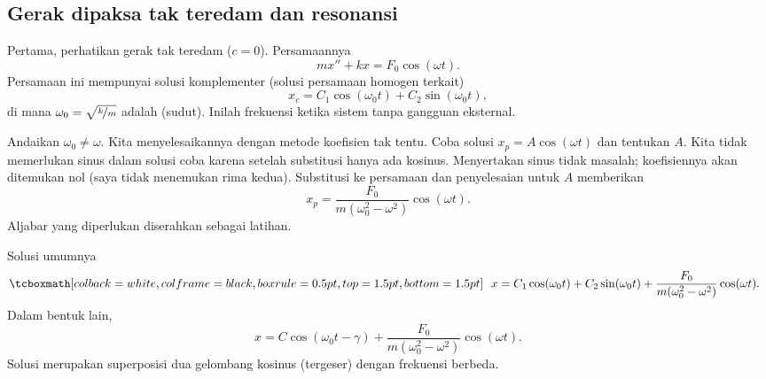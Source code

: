 \subsection{Gerak dipaksa tak teredam dan resonansi}

Pertama, perhatikan gerak tak teredam ($c=0$). Persamaannya
\begin{equation*}
mx'' + kx = F_0 \cos (\omega t) .
\end{equation*}
Persamaan ini mempunyai solusi komplementer (solusi persamaan homogen terkait)
\begin{equation*}
x_c = C_1 \cos (\omega_0 t) + C_2 \sin (\omega_0 t) ,
\end{equation*}
di mana $\omega_0 = \sqrt{\nicefrac{k}{m}}$ adalah \emph{} (sudut). Inilah frekuensi ketika sistem  tanpa gangguan eksternal.

Andaikan $\omega_0 \neq \omega$. Kita menyelesaikannya dengan metode koefisien tak tentu. Coba solusi $x_p = A \cos (\omega t)$ dan tentukan $A$. Kita tidak memerlukan sinus dalam solusi coba karena setelah substitusi hanya ada kosinus. Menyertakan sinus tidak masalah; koefisiennya akan ditemukan nol (saya tidak menemukan rima kedua). Substitusi ke persamaan dan penyelesaian untuk $A$ memberikan
\begin{equation*}
x_p = \frac{F_0}{m(\omega_0^2 - \omega^2)} \cos (\omega t) .
\end{equation*}
Aljabar yang diperlukan diserahkan sebagai latihan.

Solusi umumnya
\begin{equation*}
\mybxbg{
~~
x = C_1 \cos (\omega_0 t) + C_2 \sin (\omega_0 t) +
\frac{F_0}{m(\omega_0^2 - \omega^2)} \cos (\omega t) .
~~
}
\end{equation*}
Dalam bentuk lain,
\begin{equation*}
x = C \cos (\omega_0 t - \gamma) +
\frac{F_0}{m(\omega_0^2 - \omega^2)} \cos (\omega t) .
\end{equation*}
Solusi merupakan superposisi dua gelombang kosinus (tergeser) dengan frekuensi berbeda.
\pagebreak[2]

